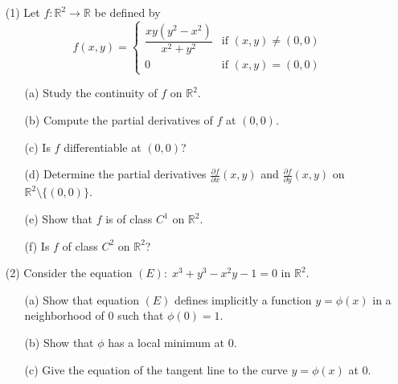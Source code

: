 \documentclass[12pt]{article}
\begin{document}
\section{}
\begin{enumerate}
    \item[(1)] Let \( f : \mathbb{R}^2 \to \mathbb{R} \) be defined by
    \[
    f(x, y) = 
    \begin{cases} 
    \dfrac{xy(y^2 - x^2)}{x^2 + y^2} & \text{if } (x, y) \neq (0, 0) \\
    0 & \text{if } (x, y) = (0, 0)
    \end{cases}
    \]
    \begin{enumerate}
        \item[(a)] Study the continuity of \( f \) on \( \mathbb{R}^2 \).
        \item[(b)] Compute the partial derivatives of \( f \) at \( (0, 0) \).
        \item[(c)] Is \( f \) differentiable at \( (0, 0) \)?
        \item[(d)] Determine the partial derivatives \( \frac{\partial f}{\partial x}(x, y) \) and \( \frac{\partial f}{\partial y}(x, y) \) on \( \mathbb{R}^2 \setminus \{(0, 0)\} \).
        \item[(e)] Show that \( f \) is of class \( C^1 \) on \( \mathbb{R}^2 \).
        \item[(f)] Is \( f \) of class \( C^2 \) on \( \mathbb{R}^2 \)?
    \end{enumerate}
    \item[(2)] Consider the equation \( (E): \; x^3 + y^3 - x^2y - 1 = 0 \) in \( \mathbb{R}^2 \).
    \begin{enumerate}
        \item[(a)] Show that equation \( (E) \) defines implicitly a function \( y = \phi(x) \) in a neighborhood of \( 0 \) such that \( \phi(0) = 1 \).
        \item[(b)] Show that \( \phi \) has a local minimum at \( 0 \).
        \item[(c)] Give the equation of the tangent line to the curve \( y = \phi(x) \) at \( 0 \).
    \end{enumerate}
\end{enumerate}
\end{document}
